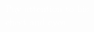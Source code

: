 \documentclass[preview,convert={density=600,outext=.png,command=\unexpanded{ {\convertexe\space -density \density\space\infile\space \ifx\size\empty\else -resize \size\fi\space -quality 90 -trim +repage -background "rgba(50,50,50,0.5)" -bordercolor "rgba(50,50,50,0.5)" -border 25 -flatten \outfile} } }]{standalone}
\begin{document}
\begin{center}
\textcolor{white}{ 
Pay attention to his \\
chest and eyes \\ }
\end{center}
\end{document}
